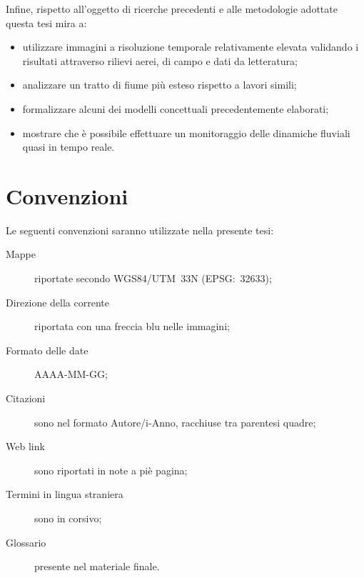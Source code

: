 Infine, rispetto all'oggetto di ricerche precedenti e alle metodologie adottate questa tesi mira a:
%
\begin{itemize}
	\item utilizzare immagini a risoluzione temporale relativamente elevata validando i risultati attraverso rilievi aerei, di campo e dati da letteratura;
	\item analizzare un tratto di fiume più esteso rispetto a lavori simili;
	\item formalizzare alcuni dei modelli concettuali precedentemente elaborati;	
	\item mostrare che è possibile effettuare un monitoraggio delle dinamiche fluviali quasi in tempo reale. 
\end{itemize}

\section{Convenzioni}
Le seguenti convenzioni saranno utilizzate nella presente tesi:
\begin{description}
	\item[Mappe] riportate secondo WGS84/UTM~33N (EPSG:~32633);
	\item[Direzione della corrente] riportata con una freccia blu nelle immagini;
	\item[Formato delle date] AAAA-MM-GG;
	\item[Citazioni] sono nel formato Autore/i-Anno, racchiuse tra parentesi quadre;
	\item[Web link] sono riportati in note a piè pagina;
	\item[Termini in lingua straniera] sono in corsivo;
	\item[Glossario] presente nel materiale finale.
\end{description}

